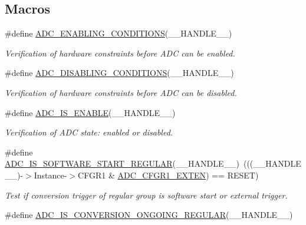 \subsection*{Macros}
\begin{DoxyCompactItemize}
\item 
\#define \hyperlink{group___a_d_c___private___macros_ga659ecd034552504fc163da87bad15ddc}{A\+D\+C\+\_\+\+E\+N\+A\+B\+L\+I\+N\+G\+\_\+\+C\+O\+N\+D\+I\+T\+I\+O\+NS}(\+\_\+\+\_\+\+H\+A\+N\+D\+L\+E\+\_\+\+\_\+)
\begin{DoxyCompactList}\small\item\em Verification of hardware constraints before A\+DC can be enabled. \end{DoxyCompactList}\item 
\#define \hyperlink{group___a_d_c___private___macros_ga52dac43dfd7bb8d95df16b30d7567c3f}{A\+D\+C\+\_\+\+D\+I\+S\+A\+B\+L\+I\+N\+G\+\_\+\+C\+O\+N\+D\+I\+T\+I\+O\+NS}(\+\_\+\+\_\+\+H\+A\+N\+D\+L\+E\+\_\+\+\_\+)
\begin{DoxyCompactList}\small\item\em Verification of hardware constraints before A\+DC can be disabled. \end{DoxyCompactList}\item 
\#define \hyperlink{group___a_d_c___private___macros_gafe3a7a04ff078c62ae98b19403f696c7}{A\+D\+C\+\_\+\+I\+S\+\_\+\+E\+N\+A\+B\+LE}(\+\_\+\+\_\+\+H\+A\+N\+D\+L\+E\+\_\+\+\_\+)
\begin{DoxyCompactList}\small\item\em Verification of A\+DC state\+: enabled or disabled. \end{DoxyCompactList}\item 
\#define \hyperlink{group___a_d_c___private___macros_ga2ccb82ecf85d6c6d1ff2cdf9b6a82d2b}{A\+D\+C\+\_\+\+I\+S\+\_\+\+S\+O\+F\+T\+W\+A\+R\+E\+\_\+\+S\+T\+A\+R\+T\+\_\+\+R\+E\+G\+U\+L\+AR}(\+\_\+\+\_\+\+H\+A\+N\+D\+L\+E\+\_\+\+\_\+)~(((\+\_\+\+\_\+\+H\+A\+N\+D\+L\+E\+\_\+\+\_\+)-\/$>$Instance-\/$>$C\+F\+G\+R1 \& \hyperlink{group___peripheral___registers___bits___definition_gafc48e957d935d791a767c763b9225832}{A\+D\+C\+\_\+\+C\+F\+G\+R1\+\_\+\+E\+X\+T\+EN}) == R\+E\+S\+ET)
\begin{DoxyCompactList}\small\item\em Test if conversion trigger of regular group is software start or external trigger. \end{DoxyCompactList}\item 
\#define \hyperlink{group___a_d_c___private___macros_ga5df8ea820271c854b85617162b08c6d3}{A\+D\+C\+\_\+\+I\+S\+\_\+\+C\+O\+N\+V\+E\+R\+S\+I\+O\+N\+\_\+\+O\+N\+G\+O\+I\+N\+G\+\_\+\+R\+E\+G\+U\+L\+AR}(\+\_\+\+\_\+\+H\+A\+N\+D\+L\+E\+\_\+\+\_\+)

\end{DoxyCompactItemize}
